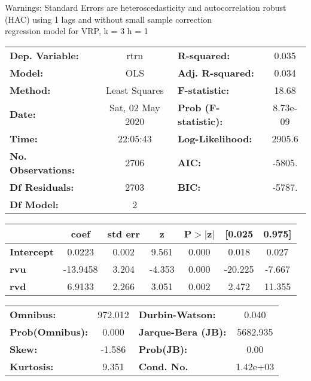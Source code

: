 Warnings: \newline
 [1] Standard Errors are heteroscedasticity and autocorrelation robust (HAC) using 1 lags and without small sample correction\\ 

regression model for VRP, k = 3 h = 1\begin{center}
\begin{tabular}{lclc}
\toprule
\textbf{Dep. Variable:}    &       rtrn       & \textbf{  R-squared:         } &     0.035   \\
\textbf{Model:}            &       OLS        & \textbf{  Adj. R-squared:    } &     0.034   \\
\textbf{Method:}           &  Least Squares   & \textbf{  F-statistic:       } &     18.68   \\
\textbf{Date:}             & Sat, 02 May 2020 & \textbf{  Prob (F-statistic):} &  8.73e-09   \\
\textbf{Time:}             &     22:05:43     & \textbf{  Log-Likelihood:    } &    2905.6   \\
\textbf{No. Observations:} &        2706      & \textbf{  AIC:               } &    -5805.   \\
\textbf{Df Residuals:}     &        2703      & \textbf{  BIC:               } &    -5787.   \\
\textbf{Df Model:}         &           2      & \textbf{                     } &             \\
\bottomrule
\end{tabular}
\begin{tabular}{lcccccc}
                   & \textbf{coef} & \textbf{std err} & \textbf{z} & \textbf{P$> |$z$|$} & \textbf{[0.025} & \textbf{0.975]}  \\
\midrule
\textbf{Intercept} &       0.0223  &        0.002     &     9.561  &         0.000        &        0.018    &        0.027     \\
\textbf{rvu}       &     -13.9458  &        3.204     &    -4.353  &         0.000        &      -20.225    &       -7.667     \\
\textbf{rvd}       &       6.9133  &        2.266     &     3.051  &         0.002        &        2.472    &       11.355     \\
\bottomrule
\end{tabular}
\begin{tabular}{lclc}
\textbf{Omnibus:}       & 972.012 & \textbf{  Durbin-Watson:     } &    0.040  \\
\textbf{Prob(Omnibus):} &   0.000 & \textbf{  Jarque-Bera (JB):  } & 5682.935  \\
\textbf{Skew:}          &  -1.586 & \textbf{  Prob(JB):          } &     0.00  \\
\textbf{Kurtosis:}      &   9.351 & \textbf{  Cond. No.          } & 1.42e+03  \\
\bottomrule
\end{tabular}
\end{center}

